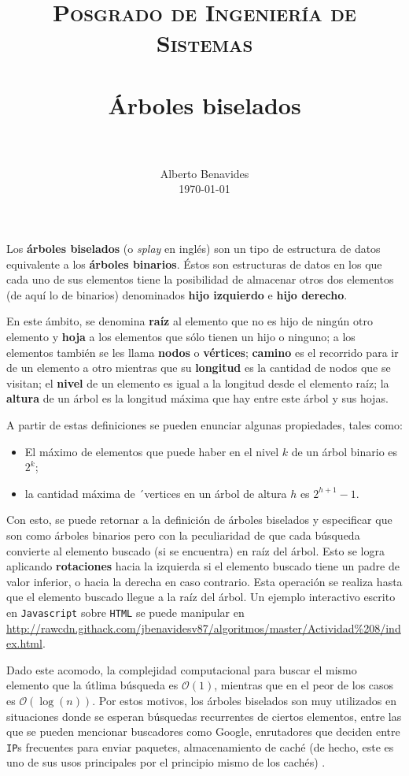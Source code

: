 \documentclass[paper=leter, fontsize=11pt]{scrartcl}
\title{
		\usefont{OT1}{bch}{b}{n}
		\normalfont \normalsize \textsc{Posgrado de Ingeniería de Sistemas} \\ [25pt]
		\horrule{0.5pt} \\[0.4cm]
		\huge Árboles biselados \\
		\horrule{2pt} \\[0.5cm]
}
\author{
		\normalfont 								\normalsize
        Alberto Benavides\\[-3pt]		\normalsize
        \today
}
\date{}
\numberwithin{equation}{section}		%
\numberwithin{figure}{section}			%
\numberwithin{table}{section}				%
\begin{document}
\maketitle

Los \textbf{árboles biselados} (o \textit{splay} en inglés) son un tipo de estructura de datos equivalente a los \textbf{árboles binarios}. Éstos son estructuras de datos en los que cada uno de sus elementos tiene la posibilidad de almacenar otros dos elementos (de aquí lo de binarios) denominados \textbf{hijo izquierdo} e \textbf{hijo derecho}. 

En este ámbito, se denomina \textbf{raíz} al elemento que no es hijo de ningún otro elemento y \textbf{hoja} a los elementos que sólo tienen un hijo o ninguno; a los elementos también se les llama \textbf{nodos} o \textbf{vértices}; \textbf{camino} es el recorrido para ir de un elemento a otro mientras que su \textbf{longitud} es la cantidad de nodos que se visitan; el \textbf{nivel} de un elemento es igual a la longitud desde el elemento raíz; la \textbf{altura} de un árbol es la longitud máxima que hay entre este árbol y sus hojas. \nocite{arboles_binarios}

A partir de estas definiciones se pueden enunciar algunas propiedades, tales como:
\begin{itemize}
    \item El máximo de elementos que puede haber en el nivel $k$ de un árbol binario es $2^{k}$;
    \item la cantidad máxima de ´vertices en un árbol de altura $h$ es $2^{h + 1} - 1$.
\end{itemize}


Con esto, se puede retornar a la definición de árboles biselados y especificar que son como árboles binarios pero con la peculiaridad de que cada búsqueda convierte al elemento buscado (si se encuentra) en raíz del árbol. Esto se logra aplicando \textbf{rotaciones} hacia la izquierda si el elemento buscado tiene un padre de valor inferior, o hacia la derecha en caso contrario. Esta operación se realiza hasta que el elemento buscado llegue a la raíz del árbol. Un ejemplo interactivo escrito en \texttt{Javascript} sobre \texttt{HTML} se puede manipular en \url{http://rawcdn.githack.com/jbenavidesv87/algoritmos/master/Actividad%208/index.html}. \nocite{python_slay_trees} \nocite{javascript_slay_trees}

Dado este acomodo, la complejidad computacional para buscar el mismo elemento que la útlima búsqueda es $\mathcal{O}(1)$, mientras que en el peor de los casos es $\mathcal{O}(\log(n))$. Por estos motivos, los árboles biselados son muy utilizados en situaciones donde se esperan búsquedas recurrentes de ciertos elementos, entre las que se pueden mencionar buscadores como Google, enrutadores que deciden entre \texttt{IP}s frecuentes para enviar paquetes, almacenamiento de caché (de hecho, este es uno de sus usos principales por el principio mismo de los cachés) \cite{splay_uses}.



\end{document}
